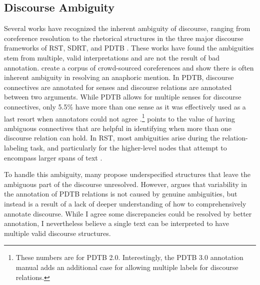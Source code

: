 \subsection{Discourse Ambiguity} Several works have recognized the inherent ambiguity of discourse, ranging from coreference resolution to the rhetorical structures in the three major discourse frameworks of RST, SDRT, and PDTB \citep{Poesio:2019,Das:2017,Asher:2003,Versley:2011}. These works have found the ambiguities stem from multiple, valid interpretations and are not the result of bad annotation. \citet{Poesio:2019} create a corpus of crowd-sourced coreferences and show there is often inherent ambiguity in resolving an anaphoric mention. In PDTB, discourse connectives are annotated for senses and discourse relations are annotated between two arguments. While PDTB allows for multiple senses for discourse connectives, only 5.5\% have more than one sense as it was effectively used as a last resort when annotators could not agree \cite{Versley:2011}.\footnote{These numbers are for PDTB 2.0. Interestingly, the PDTB 3.0 annotation manual adds an additional case for allowing multiple labels for discourse relations.} \citet{Versley:2011} points to the value of having ambiguous connectives that are helpful in identifying when more than one discourse relation can hold. In RST, most ambiguities arise during the relation-labeling task, and particularly for the higher-level nodes that attempt to encompass larger spans of text \cite{Das:2017}. 

To handle this ambiguity, many propose underspecified structures that leave the ambiguous part of the discourse unresolved. However, \citet{Webber:2012} argues that variability in the annotation of PDTB relations is not caused by genuine ambiguities, but instead is a result of a lack of deeper understanding of how to comprehensively annotate discourse. While I agree some discrepancies could be resolved by better annotation, I nevertheless believe a single text can be interpreted to have multiple valid discourse structures. 

